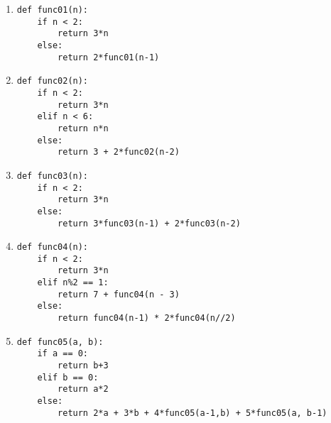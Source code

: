 \documentclass{article}
\newcommand{\li}{\item}
\begin{document}
\begin{enumerate}

\li
\begin{lstlisting}
def func01(n):
    if n < 2:
        return 3*n
    else:
        return 2*func01(n-1)
\end{lstlisting}


\li
\begin{lstlisting}
def func02(n):
    if n < 2:
        return 3*n
    elif n < 6:
        return n*n
    else:
        return 3 + 2*func02(n-2)
\end{lstlisting}


\li
\begin{lstlisting}
def func03(n):
    if n < 2:
        return 3*n
    else:
        return 3*func03(n-1) + 2*func03(n-2)
\end{lstlisting}


\li
\begin{lstlisting}
def func04(n):
    if n < 2:
        return 3*n
    elif n%2 == 1:
        return 7 + func04(n - 3)
    else:
        return func04(n-1) * 2*func04(n//2)
\end{lstlisting}


\li
\begin{lstlisting}
def func05(a, b):
    if a == 0:
        return b+3
    elif b == 0:
        return a*2
    else:
        return 2*a + 3*b + 4*func05(a-1,b) + 5*func05(a, b-1)
\end{lstlisting}


\end{enumerate}
\end{document}
